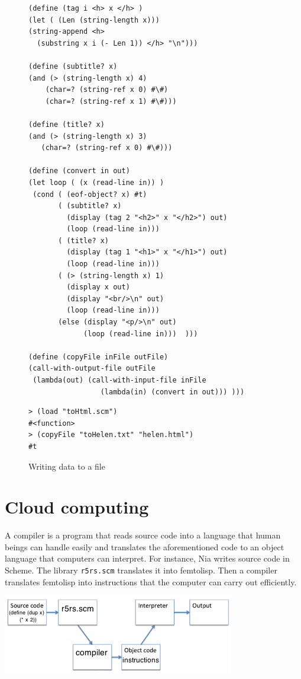\documentclass[a4paper,12pt]{book}
\newenvironment{fmpage}[1]
           {\begin{lrbox}{\fmbox}\begin{minipage}{#1}}
           {\end{minipage}\end{lrbox}\fbox{\usebox{\fmbox}}}
\begin{document}
\begin{figure}[!h]
\begin{fmpage}{\linewidth}
\begin{verbatim}
(define (tag i <h> x </h> )
(let ( (Len (string-length x)))
(string-append <h>
  (substring x i (- Len 1)) </h> "\n")))

(define (subtitle? x)
(and (> (string-length x) 4)
    (char=? (string-ref x 0) #\#)
    (char=? (string-ref x 1) #\#)))

(define (title? x)
(and (> (string-length x) 3)
   (char=? (string-ref x 0) #\#)))

(define (convert in out)
(let loop ( (x (read-line in)) )
 (cond ( (eof-object? x) #t)
       ( (subtitle? x)
         (display (tag 2 "<h2>" x "</h2>") out)
         (loop (read-line in)))
       ( (title? x)
         (display (tag 1 "<h1>" x "</h1>") out)
         (loop (read-line in)))
       ( (> (string-length x) 1)
         (display x out)
         (display "<br/>\n" out)
         (loop (read-line in)))
       (else (display "<p/>\n" out)
             (loop (read-line in)))  )))

(define (copyFile inFile outFile)
(call-with-output-file outFile
 (lambda(out) (call-with-input-file inFile
                 (lambda(in) (convert in out))) )))
\end{verbatim}
\end{fmpage}

\begin{fmpage}{\linewidth}
\begin{verbatim}
> (load "toHtml.scm")
#<function>
> (copyFile "toHelen.txt" "helen.html")
#t
\end{verbatim}
\end{fmpage}
\caption{Writing data to a file}
\label{wrtFile}
\end{figure}

\chapter{Cloud computing}\label{cloud-computing}
A compiler is a program that reads
source code into a language that
human beings can handle easily
and translates the aforementioned
code to an object language that
computers can interpret.
For instance, Nia writes source code
in   Scheme.
The library \verb|r5rs.scm| translates
it into femtolisp.
Then a compiler translates femtolisp
into instructions that the
computer can carry out efficiently.

\includegraphics[scale=0.8]{figs/source.png}
\end{document}
